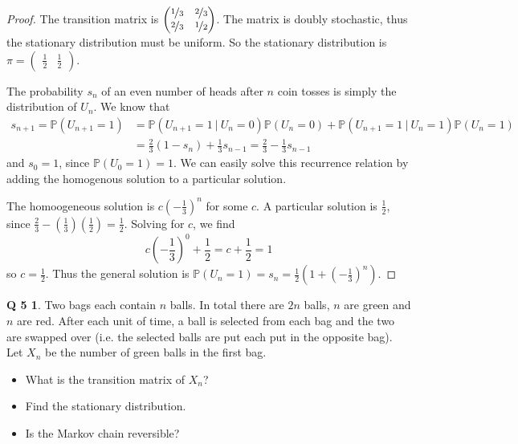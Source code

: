 \documentclass[12pt]{article}
\newcommand{\p}{\mathbb{P}}
\theoremstyle{definition}
\newtheorem*{prob5}{Q 5}
\begin{document}
\begin{proof}

The transition matrix is
$
\left(
\begin{matrix}
\nicefrac13 & \nicefrac23 \\
\nicefrac23 & \nicefrac12
\end{matrix}
\right)
$.  The matrix is doubly stochastic, thus the stationary distribution must be uniform.  So the stationary distribution is $\pi = \left(\begin{matrix} \frac12 & \frac12 \end{matrix} \right)$.

The probability $s_n$ of an even number of heads after $n$ coin tosses is simply the distribution of $U_n$.  We know that 
\begin{align*}
s_{n+1} = \p(U_{n+1} = 1) &= \p(U_{n+1} = 1 \ | \ U_n = 0)\p(U_n = 0) + \p(U_{n+1} = 1 \ | \ U_n = 1)\p(U_n = 1) \\
&= \frac23 (1-s_n) + \frac13 s_{n-1} = \frac23 - \frac13 s_{n-1}
\end{align*}
and $s_0 = 1$, since $\p(U_0 = 1) = 1$.  We can easily solve this recurrence relation by adding the homogenous solution to a particular solution.

The homoogeneous solution is $c (-\frac13)^n$ for some $c$.  A particular solution is $\frac12$, since $\frac23 - (\frac13) (\frac12) = \frac12$.  Solving for $c$, we find $$c \left(-\frac13 \right)^0 + \frac12 = c + \frac12 = 1$$ so $c = \frac12$.  Thus the general solution is $\p(U_n = 1) = s_n = \frac12 \left( 1 + \left( -\frac13 \right)^n \right)$.

\end{proof}


\begin{prob5}
Two bags each contain $n$ balls. In total there are $2n$ balls, $n$ are green and $n$ are red.  After each unit of time, a ball is selected from each bag and the two are swapped over (i.e. the selected balls are put each put in the opposite bag). Let $X_n$ be the number of green
balls in the first bag.
\begin{itemize}
\item What is the transition matrix of $X_n$?
\item Find the stationary distribution.
\item Is the Markov chain reversible?
\end{itemize}
\end{prob5}
\end{document}
